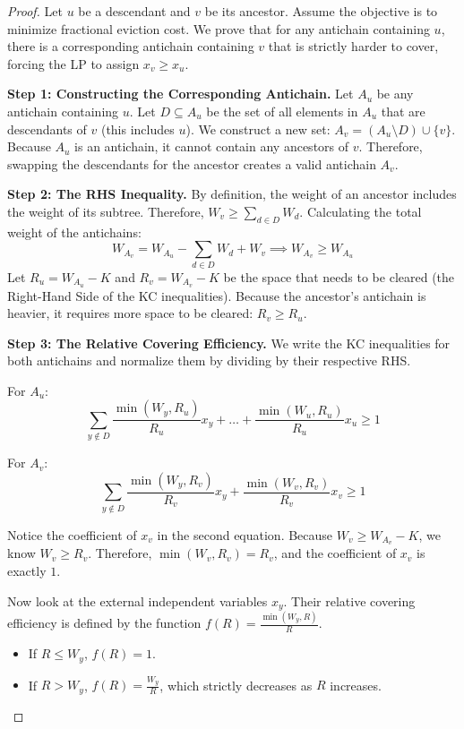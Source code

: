 \documentclass[a4paper]{article}
\begin{document}
\begin{proof}
Let $u$ be a descendant and $v$ be its ancestor. Assume the objective is to minimize fractional eviction cost. We prove that for any antichain containing $u$, there is a corresponding antichain containing $v$ that is strictly harder to cover, forcing the LP to assign $x_v \ge x_u$.

\textbf{Step 1: Constructing the Corresponding Antichain.} Let $A_u$ be any antichain containing $u$. Let $D \subseteq A_u$ be the set of all elements in $A_u$ that are descendants of $v$ (this includes $u$). We construct a new set: $A_v = (A_u \setminus D) \cup \{v\}$. Because $A_u$ is an antichain, it cannot contain any ancestors of $v$. Therefore, swapping the descendants for the ancestor creates a valid antichain $A_v$.

\textbf{Step 2: The RHS Inequality.} By definition, the weight of an ancestor includes the weight of its subtree. Therefore, $W_v \ge \sum_{d \in D} W_d$. Calculating the total weight of the antichains:
$$W_{A_v} = W_{A_u} - \sum_{d \in D} W_d + W_v \implies W_{A_v} \ge W_{A_u}$$
Let $R_u = W_{A_u} - K$ and $R_v = W_{A_v} - K$ be the space that needs to be cleared (the Right-Hand Side of the KC inequalities). Because the ancestor's antichain is heavier, it requires more space to be cleared: $R_v \ge R_u$.

\textbf{Step 3: The Relative Covering Efficiency.} We write the KC inequalities for both antichains and normalize them by dividing by their respective RHS.

For $A_u$:
$$ \sum_{y \notin D} \frac{\min(W_y, R_u)}{R_u} x_y + \dots + \frac{\min(W_u, R_u)}{R_u} x_u \ge 1 $$

For $A_v$:
$$ \sum_{y \notin D} \frac{\min(W_y, R_v)}{R_v} x_y + \frac{\min(W_v, R_v)}{R_v} x_v \ge 1 $$

Notice the coefficient of $x_v$ in the second equation. Because $W_v \ge W_{A_v} - K$, we know $W_v \ge R_v$. Therefore, $\min(W_v, R_v) = R_v$, and the coefficient of $x_v$ is exactly $1$.

Now look at the external independent variables $x_y$. Their relative covering efficiency is defined by the function $f(R) = \frac{\min(W_y, R)}{R}$.
\begin{itemize}
    \item If $R \le W_y$, $f(R) = 1$.
    \item If $R > W_y$, $f(R) = \frac{W_y}{R}$, which strictly decreases as $R$ increases.
\end{itemize}


\end{proof}
\end{document}
